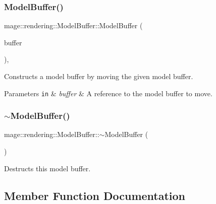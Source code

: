 \subsubsection{\texorpdfstring{Model\+Buffer()}{ModelBuffer()}\hspace{0.1cm}{\footnotesize\ttfamily [3/3]}}
{\footnotesize\ttfamily mage\+::rendering\+::\+Model\+Buffer\+::\+Model\+Buffer (\begin{DoxyParamCaption}\item[{\hyperlink{structmage_1_1rendering_1_1_model_buffer}{Model\+Buffer} \&\&}]{buffer }\end{DoxyParamCaption})\hspace{0.3cm}{\ttfamily [default]}, {\ttfamily [noexcept]}}

Constructs a model buffer by moving the given model buffer.


\begin{DoxyParams}[1]{Parameters}
\mbox{\tt in}  & {\em buffer} & A reference to the model buffer to move. \\
\hline
\end{DoxyParams}
\hypertarget{structmage_1_1rendering_1_1_model_buffer_a8234e3377ffe079b8ac045198d8cdbc1}{}\label{structmage_1_1rendering_1_1_model_buffer_a8234e3377ffe079b8ac045198d8cdbc1} 
\subsubsection{\texorpdfstring{$\sim$\+Model\+Buffer()}{~ModelBuffer()}}
{\footnotesize\ttfamily mage\+::rendering\+::\+Model\+Buffer\+::$\sim$\+Model\+Buffer (\begin{DoxyParamCaption}{ }\end{DoxyParamCaption})\hspace{0.3cm}{\ttfamily [default]}}

Destructs this model buffer. 

\subsection{Member Function Documentation}
\hypertarget{structmage_1_1rendering_1_1_model_buffer_a7435706a5297e1dfac59ac3c24a8e168}{}\label{structmage_1_1rendering_1_1_model_buffer_a7435706a5297e1dfac59ac3c24a8e168} 
